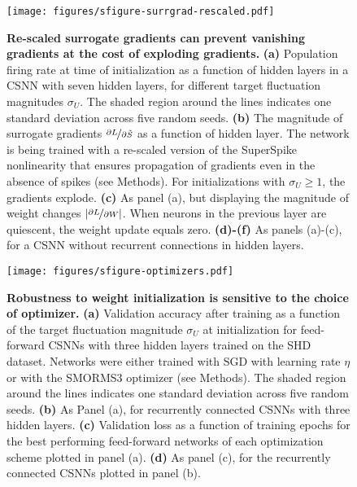 \documentclass[11pt,a4paper]{article}
\begin{document}
\begin{refsection}
\begin{figure}[htb]
	\texttt{[image: figures/sfigure-surrgrad-rescaled.pdf]}
\caption{
\textbf{Re-scaled surrogate gradients can prevent vanishing gradients
at the cost of exploding gradients.}
\textbf{(a)} Population firing rate at time of initialization  as a function of hidden layers in a \ac{CSNN} with seven hidden layers, for different target fluctuation magnitudes $\sigma_U$. The shaded region around the lines indicates one standard deviation across five random seeds.
\textbf{(b)} The magnitude of surrogate gradients $\nicefrac{\partial L}{\partial \tilde{S}}$ as a function of hidden layer. The network is being trained with a re-scaled version of the SuperSpike nonlinearity that ensures propagation of gradients even in the absence of spikes (see Methods). For initializations with $\sigma_U\geq1$, the gradients explode.
\textbf{(c)} As panel (a), but displaying the magnitude of weight changes $|\nicefrac{\partial L}{\partial W}|$. When neurons in the previous layer are quiescent, the weight update equals zero.
\textbf{(d)-(f)} As panels (a)-(c), for a \ac{CSNN} without recurrent connections in hidden layers.
}
\label{sfig:surrgrad-rescaled}
\end{figure}

\begin{figure}[htb]
	\texttt{[image: figures/sfigure-optimizers.pdf]}
\caption{
\textbf{Robustness to weight initialization is sensitive to the choice of optimizer.}
	\textbf{(a)} Validation accuracy after training as a function of the target fluctuation magnitude $\sigma_U$ at initialization for feed-forward \acp{CSNN} with three hidden layers trained on the SHD dataset. Networks were either trained with \ac{SGD} with learning rate $\eta$ or with the SMORMS3 optimizer (see Methods). The shaded region around the lines indicates one standard deviation across five random seeds.
	\textbf{(b)} As Panel (a), for recurrently connected \acp{CSNN} with three hidden layers.
	\textbf{(c)} Validation loss as a function of training epochs for the best performing feed-forward networks of each optimization scheme plotted in panel (a).
	\textbf{(d)} As panel (c), for the recurrently connected \acp{CSNN} plotted in panel (b).
}
\label{sfig:optimizers}
\end{figure}


\end{refsection}
\end{document}
